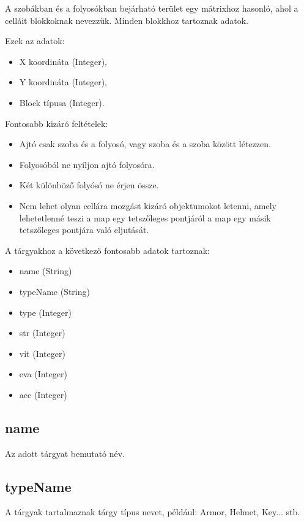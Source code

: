 A szobákban és a folyosókban bejárható terület egy mátrixhoz hasonló, ahol a celláit blokkoknak nevezzük.
Minden blokkhoz tartoznak adatok.

\noindent Ezek az adatok:

\begin{itemize}
    \item X koordináta (Integer),
    \item Y koordináta (Integer),
    \item Block típusa (Integer).
\end{itemize}

\noindent Fontosabb kizáró feltételek:

\begin{itemize}
    \item Ajtó csak szoba és a folyosó, vagy szoba és a szoba között létezzen.
    \item Folyosóból ne nyíljon ajtó folyosóra.
    \item Két különböző folyósó ne érjen össze.
    \item Nem lehet olyan cellára mozgást kizáró objektumokot letenni, amely lehetetlenné teszi a map egy tetszőleges pontjáról a map egy másik tetszőleges pontjára való eljutását.
\end{itemize}


A tárgyakhoz a következő fontosabb adatok tartoznak:
\begin{itemize}
    \item name (String)
    \item typeName (String)
    \item type (Integer)
    \item str (Integer)
    \item vit (Integer)
    \item eva (Integer)
    \item acc (Integer)
\end{itemize}

\subsection{name}

Az adott tárgyat bemutató név.

\subsection{typeName}

A tárgyak tartalmaznak tárgy típus nevet, például: Armor, Helmet, Key... stb.

